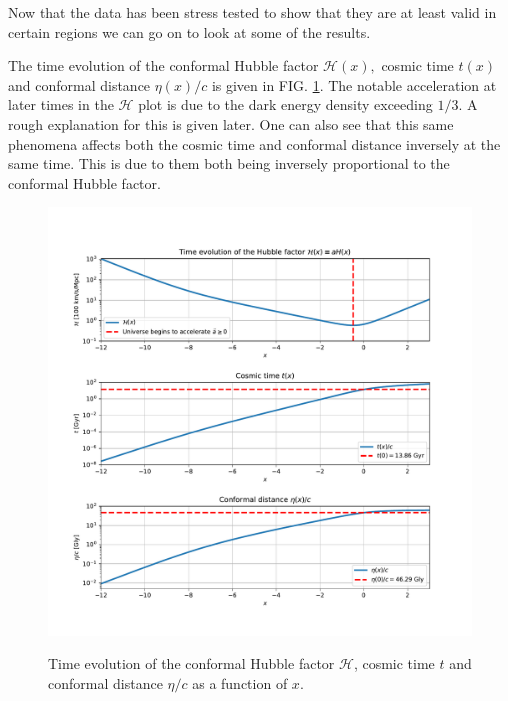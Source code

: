 \documentclass[%
reprint,
 amsmath,amssymb,
 aps,
]{revtex4-2}
\newcommand{\Hp}{\mathcal{H}}
\begin{document}
Now that the data has been stress tested to show that they are at least valid in certain regions we can go on to look at some of the results.

The time evolution of the conformal Hubble factor $\Hp(x),$ cosmic time $t(x)$ and conformal distance $\eta(x)/c$ is given in FIG. \ref{TimeEvHp}. The notable acceleration at later times in the $\Hp$ plot is due to the dark energy density exceeding $1/3$. A rough explanation for this is given later. One can also see that this same phenomena affects both the cosmic time and conformal distance inversely at the same time. This is due to them both being inversely proportional to the conformal Hubble factor.
\begin{figure}
	\caption{Time evolution of the conformal Hubble factor $\Hp$, cosmic time $t$ and conformal distance $\eta/c$ as a function of $x$.}
	\includegraphics[width = \linewidth]{Figures/merge_Hp_t_eta_Ev.pdf}
	\label{TimeEvHp}
\end{figure}
\end{document}
